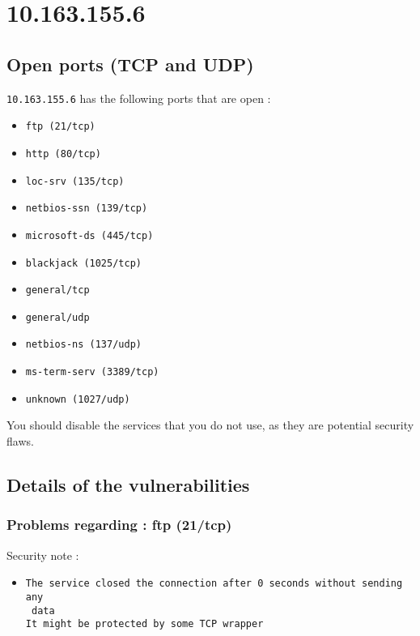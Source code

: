 \documentclass{article}
\begin{document}
\section{10.163.155.6}
\subsection{Open ports (TCP and UDP)}
\verb+10.163.155.6+ has the following ports that are open : 
\begin{itemize}
\item\verb+ftp (21/tcp)+
\item\verb+http (80/tcp)+
\item\verb+loc-srv (135/tcp)+
\item\verb+netbios-ssn (139/tcp)+
\item\verb+microsoft-ds (445/tcp)+
\item\verb+blackjack (1025/tcp)+
\item\verb+general/tcp+
\item\verb+general/udp+
\item\verb+netbios-ns (137/udp)+
\item\verb+ms-term-serv (3389/tcp)+
\item\verb+unknown (1027/udp)+
\end{itemize}
You should disable the services that you do not use, as they are potential security flaws.
\subsection{Details of the vulnerabilities}
\subsubsection{Problems regarding : ftp (21/tcp)}
Security note :\\
\begin{itemize}
\item \begin{verbatim}
The service closed the connection after 0 seconds without sending any
 data
It might be protected by some TCP wrapper

\end{verbatim}\end{itemize}
\end{document}
